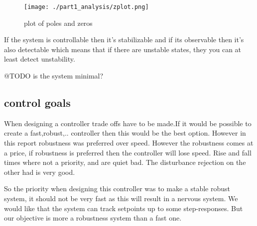 \begin{figure}[H]
	\centering
	\texttt{[image: ./part1\_analysis/zplot.png]}
	\caption{plot of poles and zeros}
	\label{fig:zplot system}
\end{figure}

If the system is controllable then it's stabilizable and if its observable then it's also detectable which means that if there are unstable states, they you can at least detect unstability.

@TODO is the system minimal?
\subsection{control goals}
When designing a controller trade offs have to be made.If it would be possible to create a fast,robust,.. controller then this would be the best option. However in this report robustness was preferred over speed. However the robustness comes at a price, if robustness is preferred then the controller will lose speed. Rise and fall times where not a priority, and are quiet bad. The disturbance rejection on the other had is very good.

So the priority when designing this controller was to make a stable robust system, it should not be very fast as this will result in a nervous system. We would like that the system can track setpoints up to some step-responses. But our objective is more a robustness system than a fast one.

